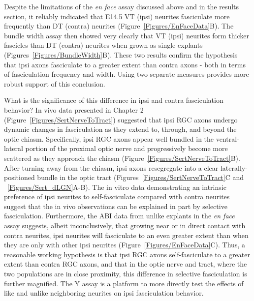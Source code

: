 Despite the limitations of the \emph{en face} assay discussed above and in the results section, it reliably indicated that E14.5 VT (ipsi) neurites fasciculate more frequently than DT (contra) neurites (Figure~\ref{Figures/EnFaceData}B).
The bundle width assay then showed very clearly that VT (ipsi) neurites form thicker fascicles than DT (contra) neurites when grown as single explants (Figures~\ref{Figures/BundleWidth}B).
These two results confirm the hypothesis that ipsi axons fasciculate to a greater extent than contra axons - both in terms of fasciculation frequency and width.
Using two separate measures provides more robust support of this conclusion.

What is the significance of this difference in ipsi and contra fasciculation behavior?
In vivo data presented in Chapter 2 (Figure~\ref{Figures/SertNerveToTract}) suggested that ipsi RGC axons undergo dynamic changes in fasciculation as they extend to, through, and beyond the optic chiasm.
Specifically, ipsi RGC axons appear well bundled in the ventral-lateral portion of the proximal optic nerve and progressively become more scattered as they approach the chiasm (Figure~\ref{Figures/SertNerveToTract}B).
After turning away from the chiasm, ipsi axons resegregate into a clear laterally-positioned bundle in the optic tract (Figures~\ref{Figures/SertNerveToTract}C and ~\ref{Figures/Sert_dLGN}A-B).
The in vitro data demonstrating an intrinsic preference of ipsi neurites to self-fasciculate compared with contra neurites suggest that the in vivo observations can be explained in part by selective fasciculation.
Furthermore, the ABI data from unlike explants in the \emph{en face} assay suggests, albeit inconclusively, that growing near or in direct contact with contra neurites, ipsi neurites will fasciculate to an even greater extent than when they are only with other ipsi neurites (Figure~\ref{Figures/EnFaceData}C).
Thus, a reasonable working hypothesis is that ipsi RGC axons self-fasciculate to a greater extent than contra RGC axons, and that in the optic nerve and tract, where the two populations are in close proximity, this difference in selective fasciculation is further magnified.
The Y assay is a platform to more directly test the effects of like and unlike neighboring neurites on ipsi fasciculation behavior.

